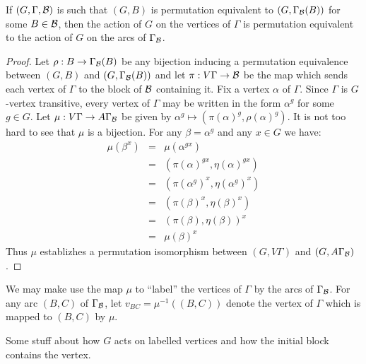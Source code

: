 \begin{proposition}
If $(G, \Gamma, \mathcal{B})$ is such that 
$(G, B)$ is permutation equivalent to $(G, \Gamma_{\mathcal{B}}(B))$
for some $B \in \mathcal{B}$, then the action of $G$
on the vertices of $\Gamma$ is permutation equivalent
to the action of $G$ on the arcs of $\Gamma_{\mathcal{B}}$.

\begin{proof}
Let $\rho : B \to \Gamma_{\mathcal{B}}(B)$ be any bijection
inducing a permutation equivalence between 
$(G,B)$ and $(G, \Gamma_{\mathcal{B}}(B))$
and let $\pi : V \Gamma \to \mathcal{B}$ be the map which sends
each vertex of $\Gamma$ to the block of $\mathcal{B}$ containing it.
Fix a vertex $\alpha$ of $\Gamma$.
Since $\Gamma$ is $G$-vertex transitive, every vertex of $\Gamma$
may be written in the form $\alpha^g$ for some $g \in G$.
Let $\mu : V \Gamma \to A \Gamma_{\mathcal{B}}$ be given by
$ \alpha^g \mapsto (\pi(\alpha)^g, \rho(\alpha)^g) $.
It is not too hard to see that $\mu$ is a bijection.
For any $\beta = \alpha^g$ and any $x \in G$ 
we have:
\begin{eqnarray*}
\mu(\beta^x) & = & \mu(\alpha^{gx})                       \\
             & = & (\pi(\alpha)^{gx}, \eta(\alpha)^{gx})    \\
	     & = & (\pi(\alpha^g)^x, \eta(\alpha^g)^x)      \\
	     & = & (\pi(\beta)^x, \eta(\beta)^x)            \\
	     & = & (\pi(\beta), \eta(\beta))^x              \\
	     & = & \mu(\beta)^x
\end{eqnarray*}
Thus $\mu$ establizhes a permutation isomorphism between
$(G,V \Gamma)$ and $(G, A \Gamma_{\mathcal{B}})$.

\end{proof}
\end{proposition}

We may make use the map $\mu$ to ``label'' the vertices
of $\Gamma$ by the arcs of $\Gamma_{\mathcal{B}}$.
For any arc $(B,C)$ of $\Gamma_{\mathcal{B}}$, 
let $v_{BC} = \mu^{-1}((B,C))$ denote
the vertex of $\Gamma$ which is mapped to $(B,C)$ by $\mu$.

\begin{proposition}
\label{labelling}
Some stuff about how $G$ acts on labelled vertices
and how the initial block contains the vertex.
\end{proposition}

